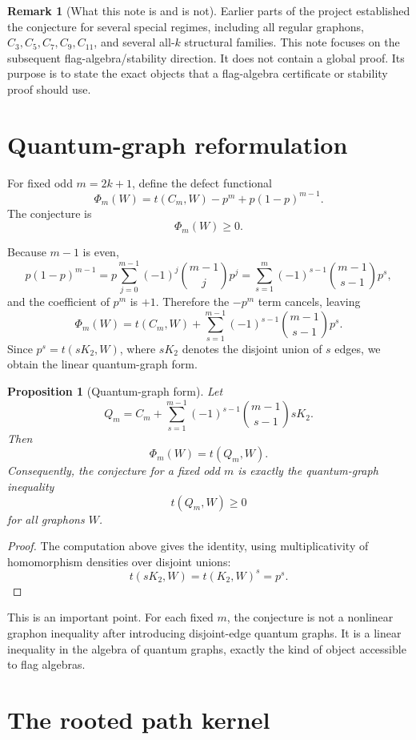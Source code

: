\documentclass[11pt]{article}
\newtheorem{proposition}[theorem]{Proposition}
\theoremstyle{definition}
\newtheorem{remark}[theorem]{Remark}
\begin{document}
\begin{remark}[What this note is and is not]
Earlier parts of the project established the conjecture for several special regimes, including all regular graphons, $C_3,C_5,C_7,C_9,C_{11}$, and several all-$k$ structural families.  This note focuses on the subsequent flag-algebra/stability direction.  It does not contain a global proof.  Its purpose is to state the exact objects that a flag-algebra certificate or stability proof should use.
\end{remark}

\section{Quantum-graph reformulation}

For fixed odd $m=2k+1$, define the defect functional
\[
        \Phi_m(W)=t(C_m,W)-p^m+p(1-p)^{m-1}.
\]
The conjecture is
\[
        \Phi_m(W)\ge0.
\]

Because $m-1$ is even,
\[
        p(1-p)^{m-1}=p\sum_{j=0}^{m-1}(-1)^j\binom{m-1}{j}p^j
        =\sum_{s=1}^{m}(-1)^{s-1}\binom{m-1}{s-1}p^s,
\]
and the coefficient of $p^m$ is $+1$.  Therefore the $-p^m$ term cancels, leaving
\[
        \Phi_m(W)
        =t(C_m,W)+\sum_{s=1}^{m-1}(-1)^{s-1}\binom{m-1}{s-1}p^s.
\]
Since $p^s=t(sK_2,W)$, where $sK_2$ denotes the disjoint union of $s$ edges, we obtain the linear quantum-graph form.

\begin{proposition}[Quantum-graph form]
Let
\[
        Q_m=C_m+
        \sum_{s=1}^{m-1}(-1)^{s-1}\binom{m-1}{s-1}sK_2.
\]
Then
\[
        \Phi_m(W)=t(Q_m,W).
\]
Consequently, the conjecture for a fixed odd $m$ is exactly the quantum-graph inequality
\[
        t(Q_m,W)\ge0
\]
for all graphons $W$.
\end{proposition}

\begin{proof}
The computation above gives the identity, using multiplicativity of homomorphism densities over disjoint unions:
\[
        t(sK_2,W)=t(K_2,W)^s=p^s.
\]
\end{proof}

This is an important point.  For each fixed $m$, the conjecture is not a nonlinear graphon inequality after introducing disjoint-edge quantum graphs.  It is a linear inequality in the algebra of quantum graphs, exactly the kind of object accessible to flag algebras.

\section{The rooted path kernel}
\end{document}
